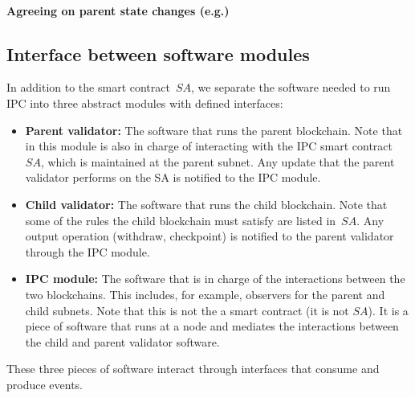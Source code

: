 \begin{itemize}
\end{itemize}



\paragraph{Agreeing on parent state changes (e.g.)}

\subsection{Interface between software modules}
In addition to the smart contract~$SA$, we separate the software needed to run IPC into three abstract modules with defined interfaces:
\begin{itemize}
    \item \textbf{Parent validator:} The software that runs the parent blockchain. Note that in this module is also in charge of interacting with the IPC smart contract~$SA$, which is maintained at the parent subnet. Any update that the parent validator performs on the SA is notified to the IPC module.
    \item \textbf{Child validator:} The software that runs the child blockchain. Note that some of the rules the child blockchain must satisfy are listed in~$SA$. Any output operation (withdraw, checkpoint) is notified to the parent validator through the IPC module. 
    \item \textbf{IPC module:} The software that is in charge of the interactions between the two blockchains. This includes, for example, observers for the parent and child subnets. Note that this is not the a smart contract (it is not $SA$). It is a piece of software that runs at a node and mediates the interactions between the child and parent validator software. 
    
\end{itemize}
These three pieces of software interact through interfaces that consume and produce events.
